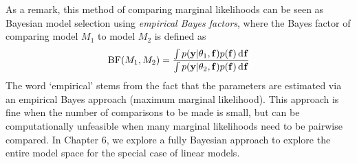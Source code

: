 As a remark, this method of comparing marginal likelihoods can be seen as Bayesian model selection using \emph{empirical Bayes factors}, where the Bayes factor of comparing model $M_1$ to model $M_2$ is defined as
\[
  \operatorname{BF}(M_1,M_2) = \frac{\int p({\mathbf y}|\theta_1,{\mathbf f})p({\mathbf f}) \operatorname{d}\hspace{0.5pt}\! {\mathbf f} }{\int p({\mathbf y}|\theta_2,{\mathbf f})p({\mathbf f}) \operatorname{d}\hspace{0.5pt}\! {\mathbf f}}
\]
The word ‘empirical’ stems from the fact that the parameters are estimated via an empirical Bayes approach (maximum marginal likelihood).
This approach is fine when the number of comparisons to be made is small, but can be computationally unfeasible when many marginal likelihoods need to be pairwise compared.
In Chapter 6, we explore a fully Bayesian approach to explore the entire model space for the special case of linear models.


